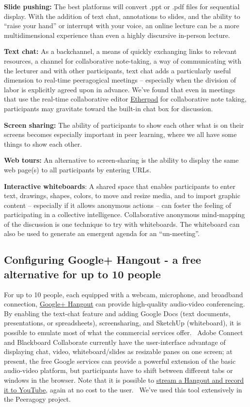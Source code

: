 \textbf{Slide pushing:} The best platforms will convert .ppt or .pdf
files for sequential display. With the addition of text chat,
annotations to slides, and the ability to ``raise your hand'' or
interrupt with your voice, an online lecture can be a more
multidimensional experience than even a highly discursive in-person
lecture.

\textbf{Text chat:} As a backchannel, a means of quickly exchanging
links to relevant resources, a channel for collaborative note-taking, a
way of communicating with the lecturer and with other participants, text
chat adds a particularly useful dimension to real-time peeragogical
meetings -- especially when the division of labor is explicitly agreed
upon in advance. We've found that even in meetings that use the
real-time collaborative editor \href{http://etherpad.org}{Etherpad} for
collaborative note taking, participants may gravitate toward the
built-in chat box for discussion.

\textbf{Screen sharing:} The ability of participants to show each other
what is on their screens becomes especially important in peer learning,
where we all have some things to show each other.

\textbf{Web tours:} An alternative to screen-sharing is the ability to
display the same web page(s) to all participants by entering URLs.

\textbf{Interactive whiteboards}: A shared space that enables
participants to enter text, drawings, shapes, colors, to move and resize
media, and to import graphic content -- especially if it allows
anonymous actions -- can foster the feeling of participating in a
collective intelligence. Collaborative anonymous mind-mapping of the
discussion is one technique to try with whiteboards. The whiteboard can
also be used to generate an emergent agenda for an ``un-meeting''.

\subsection{Configuring Google+ Hangout - a free alternative for up to
10 people}

For up to 10 people, each equipped with a webcam, microphone, and
broadband connection,
\href{http://lifehacker.com/5842191/google\%252B-hangouts-adds-screen-sharing-google-docs-collaboration-and-more}{Google+
Hangout} can provide high-quality audio-video conferencing. By enabling
the text-chat feature and adding Google Docs (text documents,
presentations, or spreadsheets), screensharing, and SketchUp
(whiteboard), it is possible to emulate most of what the commercial
services offer.~ Adobe Connect and Blackboard Collaborate currently have
the user-interface advantage of displaying chat, video,
whiteboard/slides as resizable panes on one screen; at present, the free
Google services can provide a powerful extension of the basic
audio-video platform, but participants have to shift between different
tabs or windows in the browser. Note that it is possible to
\href{http://www.google.com/+/learnmore/hangouts/onair.html}{stream a
Hangout and record it to YouTube}, again at no cost to the user.~ We've
used this tool extensively in the Peeragogy project.

